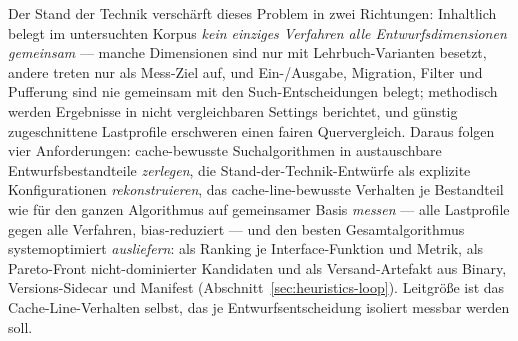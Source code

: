 \begin{nurkurz}
Der Stand der Technik verschärft dieses Problem in zwei Richtungen: Inhaltlich belegt im untersuchten Korpus
\emph{kein einziges Verfahren alle Entwurfsdimensionen gemeinsam} --- manche Dimensionen sind nur mit
Lehrbuch-Varianten besetzt, andere treten nur als Mess-Ziel auf, und Ein-/Ausgabe, Migration, Filter und
Pufferung sind nie gemeinsam mit den Such-Entscheidungen belegt; methodisch werden Ergebnisse in nicht
vergleichbaren Settings berichtet, und günstig zugeschnittene Lastprofile erschweren einen fairen Quervergleich.
Daraus folgen vier Anforderungen: cache-bewusste Suchalgorithmen in austauschbare Entwurfsbestandteile
\emph{zerlegen}, die Stand-der-Technik-Entwürfe als explizite Konfigurationen \emph{rekonstruieren}, das
cache-line-bewusste Verhalten je Bestandteil wie für den ganzen Algorithmus auf gemeinsamer Basis \emph{messen}
--- alle Lastprofile gegen alle Verfahren, bias-reduziert --- und den besten Gesamtalgorithmus systemoptimiert
\emph{ausliefern}: als Ranking je Interface-Funktion und Metrik, als Pareto-Front nicht-dominierter Kandidaten
und als Versand-Artefakt aus Binary, Versions-Sidecar und Manifest (Abschnitt~\ref{sec:heuristics-loop}).
Leitgröße ist das Cache-Line-Verhalten selbst, das je Entwurfsentscheidung isoliert messbar werden soll.
\end{nurkurz}

